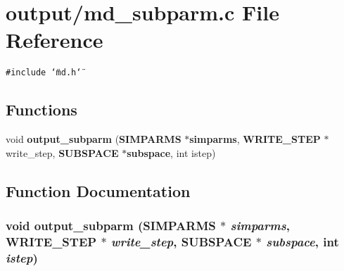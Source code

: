 \section{output/md\_\-subparm.c File Reference}
\label{md__subparm_8c}
{\tt \#include \char`\"{}md.h\char`\"{}}\par
\subsection*{Functions}
\begin{CompactItemize}
\item 
void {\bf output\_\-subparm} ({\bf SIMPARMS} $\ast${\bf simparms}, {\bf WRITE\_\-STEP} $\ast$write\_\-step, {\bf SUBSPACE} $\ast${\bf subspace}, int istep)
\end{CompactItemize}


\subsection{Function Documentation}
\subsubsection{\setlength{\rightskip}{0pt plus 5cm}void output\_\-subparm ({\bf SIMPARMS} $\ast$ {\em simparms}, {\bf WRITE\_\-STEP} $\ast$ {\em write\_\-step}, {\bf SUBSPACE} $\ast$ {\em subspace}, int {\em istep})}\label{md__subparm_8c_0b7fb648a728bb8014fd20370b38d70b}


